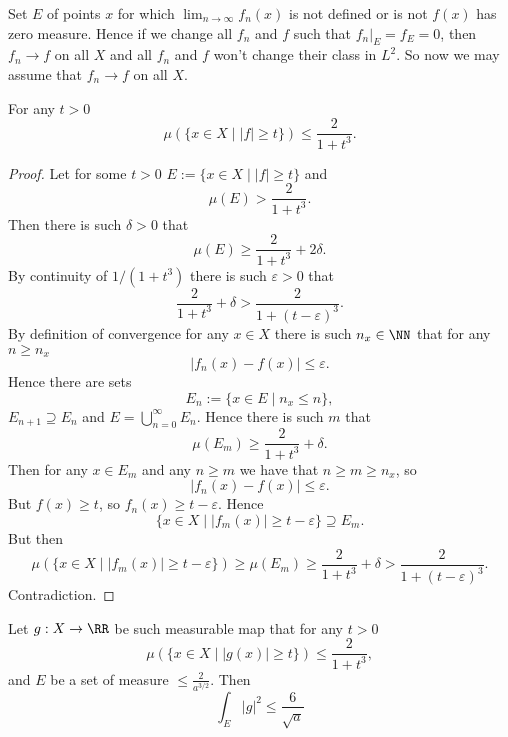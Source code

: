 \documentclass[12pt,a4paper]{article}
\begin{document}
    \begin{enumproblem}
        Set $E$ of points $x$ for which $\lim_{n \to \infty} f_n(x)$ is not defined or is not $f(x)$ has zero measure. Hence if we change all $f_n$ and $f$ such that $f_n|_E = f_E = 0$, then $f_n \to f$ on all $X$ and all $f_n$ and $f$ won't change their class in $L^2$. So now we may assume that $f_n \to f$ on all $X$.

        \begin{lemma}
            For any $t > 0$
            \[\mu(\{x \in X \mid |f| \geqslant t\}) \leqslant \frac{2}{1 + t^3}.\]
        \end{lemma}

        \begin{proof}
            Let for some $t > 0$ $E := \{x \in X \mid |f| \geqslant t\}$ and
            \[\mu(E) > \frac{2}{1 + t^3}.\]
            Then there is such $\delta > 0$ that
            \[\mu(E) \geqslant \frac{2}{1 + t^3} + 2\delta.\]
            By continuity of $1/(1 + t^3)$ there is such $\varepsilon > 0$ that
            \[\frac{2}{1 + t^3} + \delta > \frac{2}{1 + (t-\varepsilon)^3}.\]
            By definition of convergence for any $x \in X$ there is such $n_x \in \NN$ that for any $n \geqslant n_x$
            \[|f_n(x) - f(x)| \leqslant \varepsilon.\]
            Hence there are sets
            \[E_n := \{x \in E \mid n_x \leqslant n\},\]
            $E_{n+1} \supseteq E_n$ and $E = \bigcup_{n=0}^\infty E_n$. Hence there is such $m$ that
            \[\mu(E_m) \geqslant \frac{2}{1 + t^3} + \delta.\]
            Then for any $x \in E_m$ and any $n \geqslant m$ we have that $n \geqslant m \geqslant n_x$, so
            \[|f_n(x) - f(x)| \leqslant \varepsilon.\]
            But $f(x) \geqslant t$, so $f_n(x) \geqslant t - \varepsilon$. Hence
            \[\{x \in X \mid |f_m(x)| \geqslant t - \varepsilon\} \supseteq E_m.\]
            But then
            \[\mu(\{x \in X \mid |f_m(x)| \geqslant t - \varepsilon\}) \geqslant \mu(E_m) \geqslant \frac{2}{1 + t^3} + \delta > \frac{2}{1 + (t-\varepsilon)^3}.\]
            Contradiction. 
        \end{proof}

        \begin{lemma}
            Let $g: X \to \RR$ be such measurable map that for any $t > 0$
            \[\mu(\{x \in X \mid |g(x)| \geqslant t\}) \leqslant \frac{2}{1 + t^3},\]
            and $E$ be a set of measure $\leqslant \frac{2}{a^{3/2}}$. Then
            \[\int_E |g|^2 \leqslant \frac{6}{\sqrt{a}}\]
        \end{lemma}


\end{enumproblem}
\end{document}
